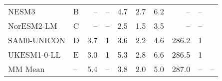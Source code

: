 \begin{table}
\begin{tabular}{llrrrrrrrl}
NESM3           &   B &    -- &                    -- &  4.7 &  2.7 &   6.2 &     -- &                   -- &  \citet{ringer20cmip} \\
NorESM2-LM      &   C &    -- &                    -- &  2.5 &  1.5 &   3.5 &     -- &                   -- &  \citet{ringer20cmip} \\
SAM0-UNICON     &   D &   3.7 &                       1 &  3.6 &  2.2 &   4.6 &  286.2 &                      1 &  \citet{ringer20cmip} \\
UKESM1-0-LL     &   E &   3.0 &                       1 &  5.3 &  2.8 &   6.6 &  286.5 &                      1 &  \citet{ringer20cmip} \\
MM Mean         &  -- &   5.4 &                    -- &  3.8 &  2.0 &   5.0 &  287.0 &                   -- &                    -- \\
\bottomrule
\end{tabular}
\end{table}
